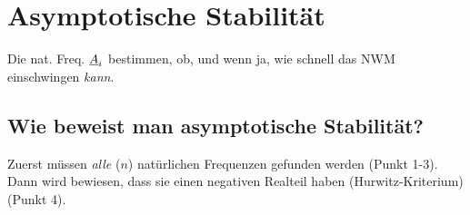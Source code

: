 
\chapter{Asymptotische Stabilität}

Die nat. Freq. $\underline{A}_i$ bestimmen, ob, und wenn ja,
wie schnell das \acs{NWM} einschwingen \emph{kann}.



\section{Wie beweist man asymptotische Stabilität?}%

Zuerst müssen \emph{alle} ($n$) natürlichen Frequenzen gefunden werden (Punkt 1-3).
Dann wird bewiesen, dass sie einen negativen Realteil haben (Hurwitz-Kriterium)
(Punkt 4).



